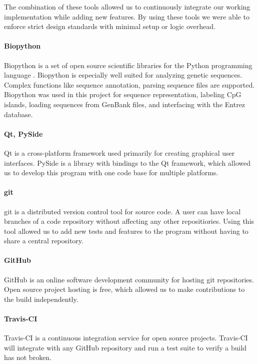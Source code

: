 \documentclass{bioinfo}
\begin{document}
The combination of these tools allowed us to continuously integrate our working implementation while adding new features. By using these tools we were able to enforce strict design standards with minimal setup or logic overhead.

\paragraph{Biopython\textcolon}
      Biopython is a set of open source scientific libraries for the Python programming language \citep{pmid19304878}. Biopython is especially well suited for analyzing genetic sequences. Complex functions like sequence annotation, parsing sequence files are supported. Biopython was used in this project for sequence representation, labeling CpG islands, loading sequences from GenBank files, and interfacing with the Entrez database.\\
    
\paragraph{Qt, PySide\textcolon}
Qt is a cross-platform framework used primarily for creating graphical user interfaces. PySide is a library with bindings to the Qt framework, which allowed us to develop this program with one code base for multiple platforms.

\paragraph{git\textcolon} 
git is a distributed version control tool for source code. A user can have local branches of a code repository without affecting any other repositiories. Using this tool allowed us to add new tests and features to the program without having to share a central repository.

\paragraph{GitHub\textcolon} 
GitHub is an online software development community for hosting git repositories. Open source project hosting is free, which allowed us to make contributions to the build independently.
    
\paragraph{Travis-CI\textcolon}
Travis-CI is a continuous integration service for open source projects. Travis-CI will integrate with any GitHub repository and run a test suite to verify a build has not broken.
\end{document}
